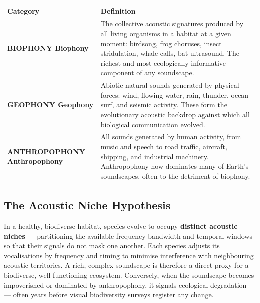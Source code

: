 \documentclass[12pt, a4paper]{article}
\newcommand{\tagbio}[0]{\colorbox{green!20}{\textcolor{green!50!black}{\small\bfseries BIOPHONY}}}
\newcommand{\taggeo}[0]{\colorbox{blue!15}{\textcolor{blue!70!black}{\small\bfseries GEOPHONY}}}
\newcommand{\taganthro}[0]{\colorbox{orange!20}{\textcolor{orange!60!black}{\small\bfseries ANTHROPOPHONY}}}
\begin{document}
\vspace{6pt}
\begin{center}
\begin{tabularx}{0.96\linewidth}{>{\bfseries\color{forestgreen}}p{3cm} X}
\toprule
\rowcolor{rowshade}
Category & Definition \\
\midrule
\tagbio{} Biophony
  & The collective acoustic signatures produced by all living organisms in a habitat at a given
    moment: birdsong, frog choruses, insect stridulation, whale calls, bat ultrasound. The
    richest and most ecologically informative component of any soundscape. \\
\addlinespace
\taggeo{} Geophony
  & Abiotic natural sounds generated by physical forces: wind, flowing water, rain, thunder,
    ocean surf, and seismic activity. These form the evolutionary acoustic backdrop against which
    all biological communication evolved. \\
\addlinespace
\taganthro{} Anthropophony
  & All sounds generated by human activity, from music and speech to road traffic, aircraft,
    shipping, and industrial machinery. Anthropophony now dominates many of Earth's soundscapes,
    often to the detriment of biophony. \\
\bottomrule
\end{tabularx}
\end{center}

\subsection{The Acoustic Niche Hypothesis}

\begin{greenbox}[title=The Acoustic Niche Hypothesis --- Bernie Krause (1993)]
In a healthy, biodiverse habitat, species evolve to occupy \textbf{distinct acoustic niches} ---
partitioning the available frequency bandwidth and temporal windows so that their signals do not
mask one another. Each species adjusts its vocalisations by frequency and timing to minimise
interference with neighbouring acoustic territories. A rich, complex soundscape is therefore a
direct proxy for a biodiverse, well-functioning ecosystem. Conversely, when the soundscape
becomes impoverished or dominated by anthropophony, it signals ecological degradation --- often
years before visual biodiversity surveys register any change.
\end{greenbox}

\newpage

\end{document}
